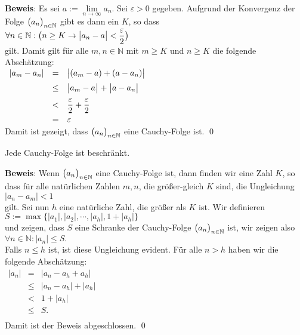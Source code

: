 \noindent
\textbf{Beweis}:  Es sei $a := \lim\limits_{n\rightarrow\infty} a_n$. 
Sei $\varepsilon > 0$ gegeben.  Aufgrund der Konvergenz der Folge $\bigl(a_n\bigr)_{n\in\mathbb{N}}$ gibt es
dann ein $K$, so dass 
\\[0.2cm]
\hspace*{1.3cm}
$\displaystyle\forall n \in \mathbb{N}:\bigl( n \geq K \rightarrow \bigl|a_n-a\bigr| < \frac{\varepsilon}{2}\bigr)$
\\[0.2cm]
gilt.  Damit gilt f\"ur alle $m,n\in\mathbb{N}$ mit $m \geq K$ und $n \geq K$ die folgende Absch\"atzung:
\\[0.2cm]
\hspace*{1.3cm}
$
   \begin{array}{lcl}
     |a_m - a_n| &   =  & \bigl|(a_m - a) + (a - a_n)\bigr| \\[0.2cm]
                 & \leq & \bigl|a_m - a\bigr| \;+\; \bigr|a - a_n\bigr| \\[0.2cm]
                 &   <  & \displaystyle\frac{\varepsilon}{2} + \frac{\varepsilon}{2} \\[0.2cm]
                 &   =  & \varepsilon     
   \end{array}
$
\\[0.2cm]
Damit ist gezeigt, dass $\bigl(a_n\bigr)_{n\in\mathbb{N}}$ eine Cauchy-Folge ist. \qed

\begin{Satz}
  Jede Cauchy-Folge ist beschr\"ankt.
\end{Satz}

\noindent
\textbf{Beweis}:  Wenn $\bigl(a_n\bigr)_{n\in\mathbb{N}}$ eine Cauchy-Folge ist, dann finden wir eine Zahl
$K$, so dass f\"ur alle nat\"urlichen Zahlen $m,n$, die gr\"o\ss{}er-gleich $K$ sind, die Ungleichung
\\[0.2cm]
\hspace*{1.3cm}
$ \bigl| a_n - a_m | < 1 $
\\[0.2cm]
gilt.  Sei nun $h$ eine nat\"urliche Zahl, die gr\"o\ss{}er als $K$ ist.  Wir definieren
\\[0.2cm]
\hspace*{1.3cm}
$ S := \max\bigl\{ |a_1|, |a_2|, \cdots,  |a_h|, 1+ |a_h|\bigr\} $
\\[0.2cm]
und zeigen, dass $S$ eine  Schranke der Cauchy-Folge $\bigl(a_n\bigr)_{n\in\mathbb{N}}$ ist, wir zeigen also
\\[0.2cm]
\hspace*{1.3cm}
$ \forall n \in \mathbb{N} : |a_n| \leq S. $
\\[0.2cm]
Falls $n \leq h$ ist, ist diese Ungleichung evident.  F\"ur alle $n>h$ haben wir die folgende
Absch\"atzung: 
\\[0.2cm]
\hspace*{1.3cm}
$ 
\begin{array}{lcl}
  \bigl| a_n \bigr| & =    & \bigl| a_n - a_h + a_h \bigr| \\[0.2cm]
                    & \leq & \bigl| a_n - a_h \bigr| + \bigl| a_h \bigr| \\[0.2cm]
                    & <    & 1 + \bigl| a_h \bigr| \\[0.2cm]
                    & \leq & S. \\[0.2cm]
\end{array}
$
\\[0.2cm]
Damit ist der Beweis abgeschlossen. \qed 

